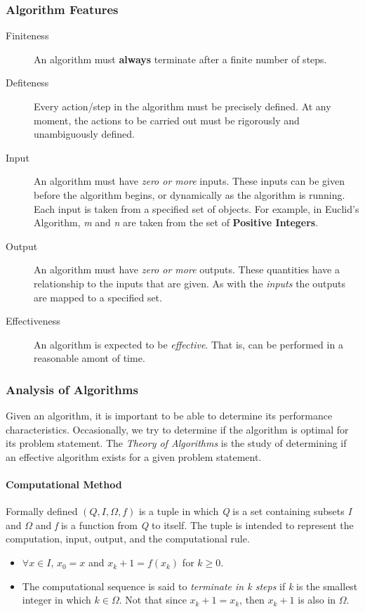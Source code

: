\documentclass{article}
\begin{document}
	\subsubsection{Algorithm Features}
	\begin{description}
		\item[Finiteness] An algorithm must \textbf{always} terminate after a finite number of steps.
		\item[Defiteness] Every action/step in the algorithm must be precisely defined. At any moment, the actions to be carried out must be rigorously and unambiguously defined. 
		\item[Input] An algorithm must have \textit{zero or more} inputs. These inputs can be given before the algorithm begins, or dynamically as the algorithm is running. Each input is taken from a specified set of objects. For example, in Euclid's Algorithm, \textit{m} and \textit{n} are taken from the set of \textbf{Positive Integers}.
		\item[Output] An algorithm must have \textit{zero or more} outputs. These quantities have a relationship to the inputs that are given. As with the \textit{inputs} the outputs are mapped to a specified set.
		\item[Effectiveness] An algorithm is expected to be \textit{effective}. That is, can be performed in a reasonable amont of time.
	\end{description}

	\subsubsection{Analysis of Algorithms}
	Given an algorithm, it is important to be able to determine its performance characteristics. Occasionally, we try to determine if the algorithm is optimal for its problem statement. The \textit{Theory of Algorithms} is the study of determining if an effective algorithm exists for a given problem statement. 
	\paragraph{Computational Method} Formally defined $(\textit{Q}, \textit{I}, \Omega, \textit{f})$ is a tuple in which \textit{Q} is a set containing subsets \textit{I} and $\Omega$ and \textit{f} is a function from \textit{Q} to itself. The tuple is intended to represent the computation, input, output, and the computational rule. 
	\begin{itemize}
		\item $\forall \textit{x} \in \textit{I}$, $x_0 = x$ and $x_k+1 = f(x_k)$ for $k \geq 0$.
		\item The computational sequence is said to \textit{terminate in k steps} if \textit{k} is the smallest integer in which $\textit{k} \in \Omega$. Not that since $x_k+1 = x_k$, then $x_k+1$ is also in $\Omega$.

	\end{itemize}
\end{document}
